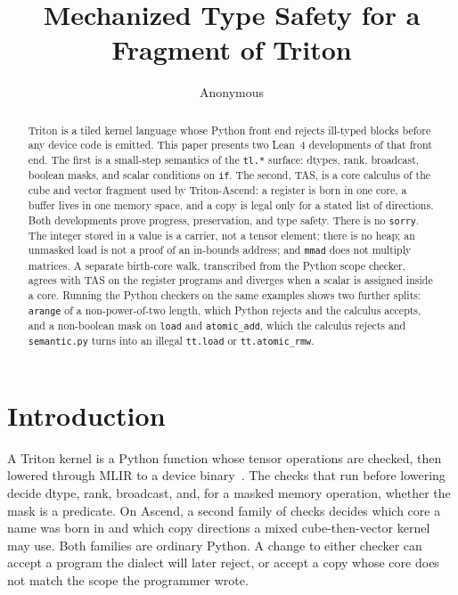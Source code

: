 \documentclass[a4paper,UKenglish,anonymous,cleveref,autoref]{lipics-v2021}
\title{Mechanized Type Safety for a Fragment of Triton}
\author{Anonymous}{Anonymous}{}{}{}
\begin{document}
\maketitle

\begin{abstract}
Triton is a tiled kernel language whose Python front end rejects ill-typed blocks before any device code is emitted.
This paper presents two Lean~4 developments of that front end.
The first is a small-step semantics of the \texttt{tl.*} surface: dtypes, rank, broadcast, boolean masks, and scalar conditions on \texttt{if}.
The second, TAS, is a core calculus of the cube and vector fragment used by Triton-Ascend: a register is born in one core, a buffer lives in one memory space, and a copy is legal only for a stated list of directions.
Both developments prove progress, preservation, and type safety.
There is no \texttt{sorry}.
The integer stored in a value is a carrier, not a tensor element; there is no heap; an unmasked load is not a proof of an in-bounds address; and \texttt{mmad} does not multiply matrices.
A separate birth-core walk, transcribed from the Python scope checker, agrees with TAS on the register programs and diverges when a scalar is assigned inside a core.
Running the Python checkers on the same examples shows two further splits: \texttt{arange} of a non-power-of-two length, which Python rejects and the calculus accepts, and a non-boolean mask on \texttt{load} and \texttt{atomic\_add}, which the calculus rejects and \texttt{semantic.py} turns into an illegal \texttt{tt.load} or \texttt{tt.atomic\_rmw}.
\end{abstract}

\section{Introduction}
\label{sec:intro}

A Triton kernel is a Python function whose tensor operations are checked, then lowered through MLIR to a device binary~\cite{tillet2019triton,lattner2021mlir}.
The checks that run before lowering decide dtype, rank, broadcast, and, for a masked memory operation, whether the mask is a predicate.
On Ascend, a second family of checks decides which core a name was born in and which copy directions a mixed cube-then-vector kernel may use.
Both families are ordinary Python.
A change to either checker can accept a program the dialect will later reject, or accept a copy whose core does not match the scope the programmer wrote.
\end{document}
